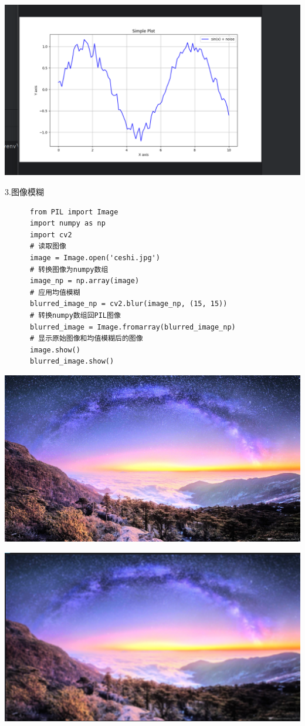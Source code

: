\documentclass{article}
\begin{document}
\noindent
\begin{minipage}{\linewidth}
 \centering
  \includegraphics[width=0.5\linewidth]{xian.png}
  \label{fig:example}
\end{minipage}

3.图像模糊
   \begin{verbatim}
      from PIL import Image
      import numpy as np
      import cv2
      # 读取图像
      image = Image.open('ceshi.jpg')
      # 转换图像为numpy数组
      image_np = np.array(image)
      # 应用均值模糊
      blurred_image_np = cv2.blur(image_np, (15, 15))
      # 转换numpy数组回PIL图像
      blurred_image = Image.fromarray(blurred_image_np)
      # 显示原始图像和均值模糊后的图像
      image.show()
      blurred_image.show()
  \end{verbatim}

\noindent
\begin{minipage}{\linewidth}
 \centering
  \includegraphics[width=0.5\linewidth]{ceshi.jpg}
  \label{fig:example}
\end{minipage}

\noindent
\begin{minipage}{\linewidth}
 \centering
  \includegraphics[width=0.5\linewidth]{mohu.png}
  \label{fig:example}
\end{minipage}
\end{document}
